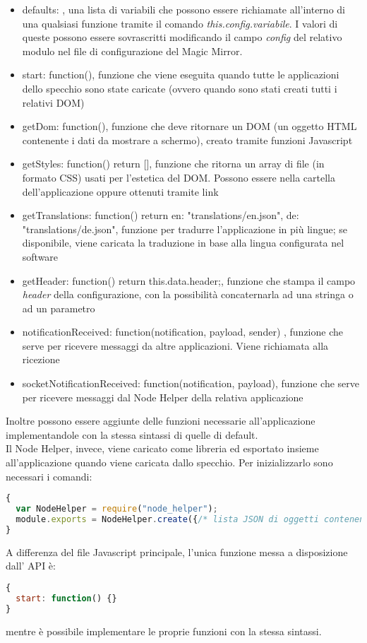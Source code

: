 \begin{itemize}
\item defaults: {}, una lista di variabili che possono essere richiamate all'interno di una qualsiasi funzione tramite il comando \textit{this.config.variabile}.
I valori di queste possono essere sovrascritti modificando il campo \textit{config} del relativo modulo nel file di configurazione del Magic Mirror.
\item start: function(){}, funzione che viene eseguita quando tutte le applicazioni dello specchio sono state caricate (ovvero quando sono stati creati tutti i relativi DOM)
\item getDom: function(){}, funzione che deve ritornare un DOM (un oggetto HTML contenente i dati da mostrare a schermo), creato tramite funzioni Javascript
\item getStyles: function() { return []}, funzione che ritorna un array di file (in formato CSS) usati per l'estetica del DOM. Possono essere nella cartella dell'applicazione
oppure ottenuti tramite link
\item getTranslations: function() {	return {en: "translations/en.json", de: "translations/de.json"}}, funzione per tradurre l'applicazione in pi\`u lingue;
se disponibile, viene caricata la traduzione in base alla lingua configurata nel software
\item getHeader: function() {	return this.data.header;}, funzione che stampa il campo \textit{header} della configurazione, con la possibilit\`a concaternarla
ad una stringa o ad un parametro
\item notificationReceived: function(notification, payload, sender) {}, funzione che serve per ricevere messaggi da altre applicazioni. Viene richiamata alla ricezione
\item socketNotificationReceived: function(notification, payload){}, funzione che serve per ricevere messaggi dal Node Helper della relativa applicazione\\[1\baselineskip]
\end{itemize}
Inoltre possono essere aggiunte delle funzioni necessarie all'applicazione implementandole con la stessa sintassi di quelle di default.
\\[1\baselineskip]
Il Node Helper, invece, viene caricato come libreria ed esportato insieme all'applicazione quando viene caricata dallo specchio. Per inizializzarlo sono
necessari i comandi:
\begin{lstlisting}[language=JavaScript]
{
  var NodeHelper = require("node_helper");
  module.exports = NodeHelper.create({/* lista JSON di oggetti contenenti funzioni*/});
}
\end{lstlisting}
A differenza del file Javascript principale, l'unica funzione messa a disposizione dall' API \`e:
\begin{lstlisting}[language=JavaScript]
{
  start: function() {}
}
\end{lstlisting}
mentre \`e possibile implementare le proprie funzioni con la stessa sintassi.

